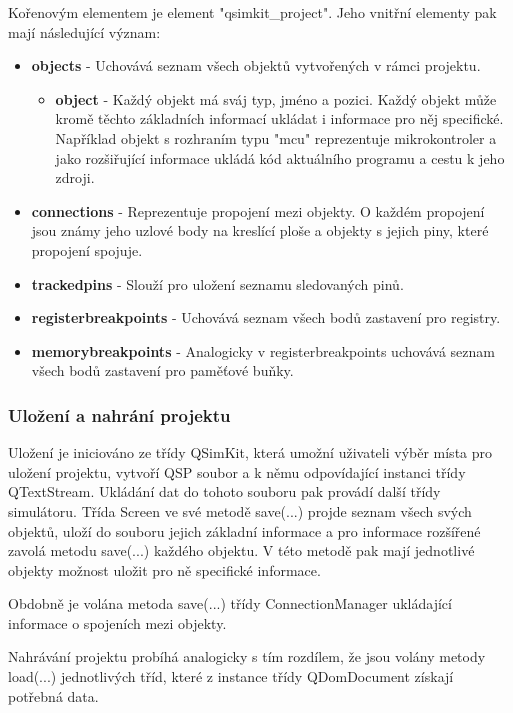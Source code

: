 Kořenovým elementem je element "qsimkit\_project". Jeho vnitřní elementy pak mají následující význam:

\begin{itemize}
\item \textbf{objects} - Uchovává seznam všech objektů vytvořených v rámci projektu.
\begin{itemize}
\item \textbf{object} - Každý objekt má sváj typ, jméno a pozici. Každý objekt může kromě těchto základních informací ukládat i informace pro něj specifické. Například objekt s rozhraním typu "mcu" reprezentuje mikrokontroler a jako rozšiřující informace ukládá kód aktuálního programu a cestu k jeho zdroji.
\end{itemize}
\item \textbf{connections} - Reprezentuje propojení mezi objekty. O každém propojení jsou známy jeho uzlové body na kreslící ploše a objekty s jejich piny, které propojení spojuje.
\item \textbf{trackedpins} - Slouží pro uložení seznamu sledovaných pinů.
\item \textbf{registerbreakpoints} - Uchovává seznam všech bodů zastavení pro registry. 
\item \textbf{memorybreakpoints} - Analogicky v registerbreakpoints uchovává seznam všech bodů zastavení pro paměťové buňky.
\end{itemize}


\subsubsection{Uložení a nahrání projektu}

Uložení je iniciováno ze třídy QSimKit, která umožní uživateli výběr místa pro uložení projektu, vytvoří QSP soubor a k němu odpovídající instanci třídy QTextStream. Ukládání dat do tohoto souboru pak provádí další třídy simulátoru. Třída Screen ve své metodě save(...) projde seznam všech svých objektů, uloží do souboru jejich základní informace a pro informace rozšířené zavolá metodu save(...) každého objektu. V této metodě pak mají jednotlivé objekty možnost uložit pro ně specifické informace.

Obdobně je volána metoda save(...) třídy ConnectionManager ukládající informace o spojeních mezi objekty.

Nahrávání projektu probíhá analogicky s tím rozdílem, že jsou volány metody load(...) jednotlivých tříd, které z instance třídy QDomDocument získají potřebná data.

